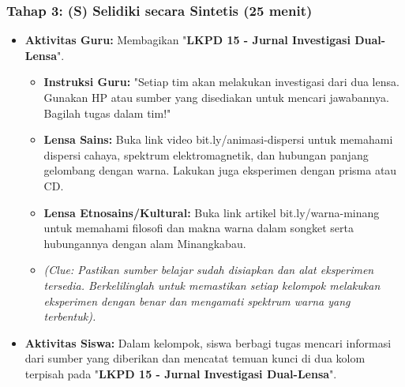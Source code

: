 \documentclass[12pt,a4paper]{article}
\begin{document}
\subsubsection{Tahap 3: (S) Selidiki secara Sintetis (25 menit)}
\begin{itemize}
\item \textbf{Aktivitas Guru:} Membagikan "\textbf{LKPD 15 - Jurnal Investigasi Dual-Lensa}".
    \begin{itemize}
    \item \textbf{Instruksi Guru:} "Setiap tim akan melakukan investigasi dari dua lensa. Gunakan HP atau sumber yang disediakan untuk mencari jawabannya. Bagilah tugas dalam tim!"
    \item \textbf{Lensa Sains:} Buka link video bit.ly/animasi-dispersi untuk memahami dispersi cahaya, spektrum elektromagnetik, dan hubungan panjang gelombang dengan warna. Lakukan juga eksperimen dengan prisma atau CD.
    \item \textbf{Lensa Etnosains/Kultural:} Buka link artikel bit.ly/warna-minang untuk memahami filosofi dan makna warna dalam songket serta hubungannya dengan alam Minangkabau.
    \item \textit{(Clue: Pastikan sumber belajar sudah disiapkan dan alat eksperimen tersedia. Berkelilinglah untuk memastikan setiap kelompok melakukan eksperimen dengan benar dan mengamati spektrum warna yang terbentuk).}
    \end{itemize}
\item \textbf{Aktivitas Siswa:} Dalam kelompok, siswa berbagi tugas mencari informasi dari sumber yang diberikan dan mencatat temuan kunci di dua kolom terpisah pada "\textbf{LKPD 15 - Jurnal Investigasi Dual-Lensa}".
\end{itemize}
\end{document}
